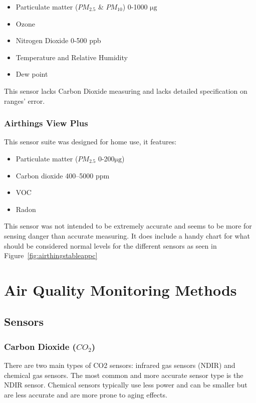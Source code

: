\begin{itemize}
	\item Particulate matter ($PM_{2.5}$ \& $PM_{10}$) 0-1000 $ \si{\micro\gram}$
	\item Ozone
	\item Nitrogen Dioxide 0-500 ppb
	\item Temperature and Relative Humidity
	\item Dew point
\end{itemize}
This sensor lacks Carbon Dioxide measuring and lacks detailed specification on ranges' error.


\subsubsection{Airthings View Plus}
This sensor suite was designed for home use, it features:
\begin{itemize}
	\item Particulate matter ($PM_{2.5}$ 0-200$ \si{\micro\gram}$)
	\item Carbon dioxide 400–5000 ppm
	\item VOC
	\item Radon
\end{itemize}
This sensor was not intended to be extremely accurate and seems to be more for sensing danger than accurate measuring.
It does include a handy chart for what should be considered normal levels for the different sensors as seen in Figure~\ref{fig:airthingstableappc}




\section{Air Quality Monitoring Methods}

\subsection{Sensors}
\subsubsection{Carbon Dioxide ($CO_2$)}
There are two main types of CO2 sensors: infrared gas sensors (NDIR) and chemical gas sensors. \cite{disruptive:co2sensor}
The most common and more accurate sensor type is the NDIR sensor. Chemical sensors typically use less power and can be smaller but are less accurate and are more prone to aging effects.

